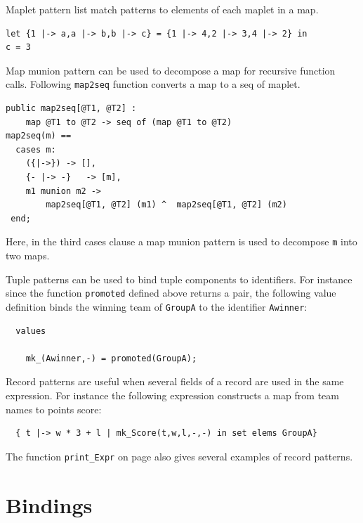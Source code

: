 \documentclass{overturerepchap}
\begin{document}
\begin{description}
Maplet pattern list match patterns to elements of each maplet in a map.
\begin{lstlisting}
let {1 |-> a,a |-> b,b |-> c} = {1 |-> 4,2 |-> 3,4 |-> 2} in
c = 3
\end{lstlisting}

Map munion pattern can be used to decompose a map for recursive function calls.
Following \texttt{map2seq} function converts a map to a seq of maplet.
\begin{lstlisting}
public map2seq[@T1, @T2] : 
    map @T1 to @T2 -> seq of (map @T1 to @T2)
map2seq(m) ==
  cases m:
    ({|->})	-> [],
    {- |-> -}	-> [m],
    m1 munion m2 -> 
        map2seq[@T1, @T2] (m1) ^  map2seq[@T1, @T2] (m2)
 end;
\end{lstlisting}
Here, in the third cases clause a map munion pattern is used to decompose \texttt{m} 
into two maps.

Tuple patterns can be used to bind tuple components to
identifiers. For instance since the function \texttt{promoted} defined
above returns a pair, the following value definition binds the winning
team of \texttt{GroupA} to the identifier \texttt{Awinner}:
\begin{lstlisting}
  values

    mk_(Awinner,-) = promoted(GroupA);
\end{lstlisting}

Record patterns are useful when several fields of a record are used in
the same expression. For instance the following expression constructs
a map from team names to points score:
\begin{lstlisting}
  { t |-> w * 3 + l | mk_Score(t,w,l,-,-) in set elems GroupA}
\end{lstlisting}
The function \texttt{print\_Expr} on page \pageref{printExprDef} also gives
several examples of record patterns.
\end{description}

\chapter{Bindings}\label{bind}
\end{document}
